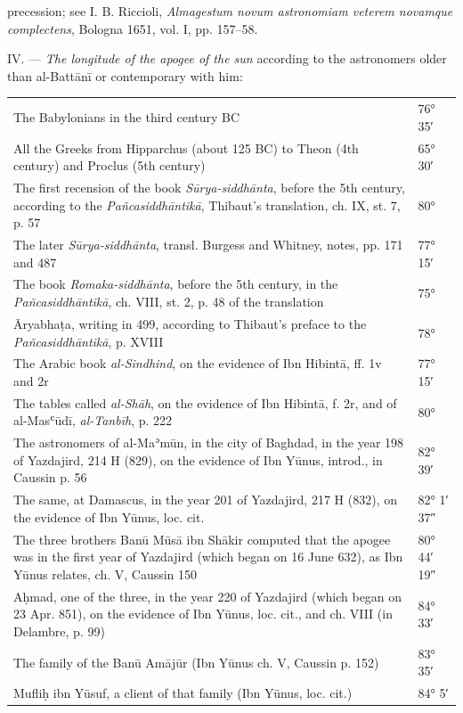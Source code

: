 \documentclass[11pt]{article}
\newcommand{\Pg}[1]{\marginpar{\footnotesize\color{gray}#1}}
\begin{document}
precession; see I. B. Riccioli, \emph{Almagestum novum astronomiam veterem novamque complectens}, Bologna 1651, vol. I, pp. 157–58.\par
\par IV. — \emph{The longitude of the apogee of the sun} according to the astronomers older than al-Battānī or contemporary with him:\par
\Pg{I 219}\begin{center}\small\begin{tabular}{p{120mm}l}
The Babylonians in the third century BC\footnotemark{} & 76° 35′ \\
All the Greeks from Hipparchus (about 125 BC) to Theon (4th century) and Proclus (5th century) & 65° 30′ \\
The first recension of the book \emph{Sūrya-siddhānta}, before the 5th century, according to the \emph{Pañcasiddhāntikā}, Thibaut's translation, ch. IX, st. 7, p. 57 & 80° \\
The later \emph{Sūrya-siddhānta}, transl. Burgess and Whitney, notes, pp. 171 and 487 & 77° 15′ \\
The book \emph{Romaka-siddhānta}, before the 5th century, in the \emph{Pañcasiddhāntikā}, ch. VIII, st. 2, p. 48 of the translation & 75° \\
Āryabhaṭa, writing in 499, according to Thibaut's preface to the \emph{Pañcasiddhāntikā}, p. XVIII & 78° \\
The Arabic book \emph{al-Sindhind}\footnotemark{}, on the evidence of Ibn Hibintā, ff. 1v and 2r & 77° 15′ \\
The tables called \emph{al-Shāh}\footnotemark{}, on the evidence of Ibn Hibintā, f. 2r, and of al-Masʿūdī, \emph{al-Tanbīh}, p. 222 & 80° \\
The astronomers of al-Maʾmūn, in the city of Baghdad, in the year 198 of Yazdajird, 214 H (829), on the evidence of Ibn Yūnus, introd., in Caussin p. 56\footnotemark{} & 82° 39′ \\
The same, at Damascus, in the year 201 of Yazdajird, 217 H (832), on the evidence of Ibn Yūnus, loc. cit. & 82° 1′ 37″ \\
The three brothers Banū Mūsā ibn Shākir computed that the apogee was in the first year of Yazdajird (which began on 16 June 632), as Ibn Yūnus relates, ch. V, Caussin 150 & 80° 44′ 19″ \\
Aḥmad, one of the three, in the year 220 of Yazdajird (which began on 23 Apr. 851), on the evidence of Ibn Yūnus, loc. cit., and ch. VIII (in Delambre, p. 99) & 84° 33′ \\
The family of the Banū Amājūr (Ibn Yūnus ch. V, Caussin p. 152) & 83° 35′ \\
Mufliḥ ibn Yūsuf, a client of that family (Ibn Yūnus, loc. cit.) & 84° 5′ \\
\end{tabular}\end{center}
\end{document}
